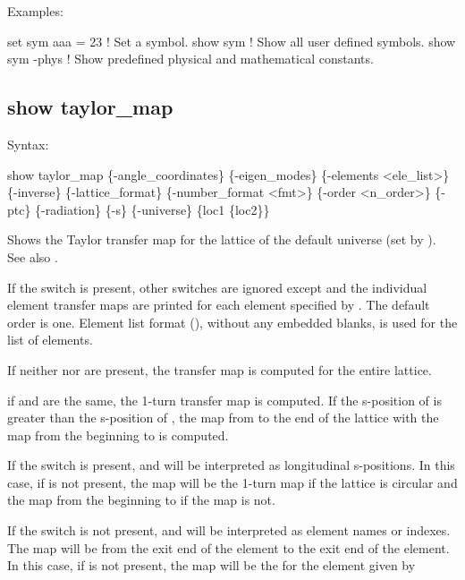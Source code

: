 {{{{{{{{{{Examples:
\begin{example}
  set sym aaa = 23  ! Set a symbol.
  show sym          ! Show all user defined symbols.
  show sym -phys    ! Show predefined physical and mathematical constants.
\end{example}


\subsection{show taylor_map}
\label{s:show.taylor}

Syntax:
\begin{example}
  show taylor_map \{-angle_coordinates\} \{-eigen_modes\} \{-elements <ele_list>\} 
            \{-inverse\} \{-lattice_format\} \{-number_format <fmt>\} \{-order <n_order>\} 
            \{-ptc\} \{-radiation\} \{-s\} \{-universe\} \{loc1 \{loc2\}\}
\end{example}

Shows the Taylor transfer map for the  lattice of the default universe (set by
). See also .

If the  switch is present, other switches are ignored except  and the
individual element transfer maps are printed for each element specified by . The
default order is one. Element list format (), without any embedded blanks,
is used for the  list of elements.

If neither  nor  are present, the transfer map is computed for the
entire lattice.

if  and  are the same, the 1-turn transfer map is computed. If the
s-position of  is greater than the s-position of , the map from
 to the end of the lattice with the map from the beginning to  is
computed.

If the  switch is present,  and  will be interpreted as longitudinal
s-positions. In this case, if  is not present, the map will be the 1-turn map if the
lattice is circular and the map from the beginning to  if the map is not.

If the  switch is not present,  and  will be interpreted as element names
or indexes. The map will be from the exit end of the  element to the exit end of the
 element. In this case, if  is not present, the map will be the for the element
given by 

}}}}}}}}}}
